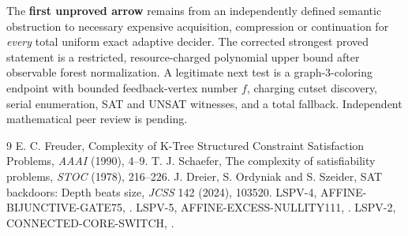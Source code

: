 \documentclass[11pt]{article}
\begin{document}
\normalsize
The \textbf{first unproved arrow} remains from an independently
defined semantic obstruction to necessary expensive acquisition,
compression or continuation for \emph{every}
total uniform exact adaptive decider. The corrected
strongest proved statement is a restricted,
resource-charged polynomial upper bound after
observable forest normalization. A legitimate
next test is a graph-3-coloring endpoint with
bounded feedback-vertex number $f$,
charging cutset discovery, serial enumeration,
SAT and UNSAT witnesses, and a total fallback.
Independent mathematical peer review is pending.
\begin{thebibliography}{9}
 E. C. Freuder, Complexity of K-Tree Structured Constraint Satisfaction Problems, \emph{AAAI} (1990), 4--9.
 T. J. Schaefer, The complexity of satisfiability problems, \emph{STOC} (1978), 216--226.
 J. Dreier, S. Ordyniak and S. Szeider, SAT backdoors: Depth beats size, \emph{JCSS} 142 (2024), 103520.
 LSPV-4, AFFINE-BIJUNCTIVE-GATE75, .
 LSPV-5, AFFINE-EXCESS-NULLITY111, .
 LSPV-2, CONNECTED-CORE-SWITCH, .
\end{thebibliography}
\end{document}
